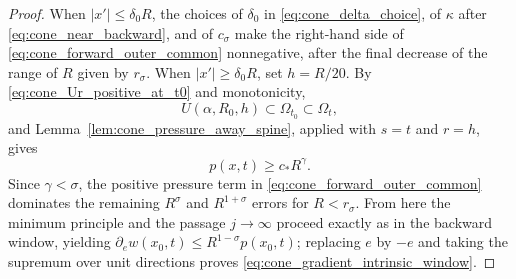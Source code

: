 \documentclass[11pt]{amsart}
\numberwithin{equation}{section}
\numberwithin{figure}{section}
\theoremstyle{plain}
\theoremstyle{definition}
\theoremstyle{remark}
\theoremstyle{plain}
\begin{document}
\begin{proof}
When \(|x'|\leq\delta_0R\), the choices of \(\delta_0\) in
\eqref{eq:cone_delta_choice}, of \(\kappa\) after
\eqref{eq:cone_near_backward}, and of \(c_\sigma\)  make the right-hand side of
\eqref{eq:cone_forward_outer_common} nonnegative, after the final decrease of the range of $R$ given by 
\(r_\sigma\). When \(|x'|\geq\delta_0R\), set \(h=R/20\). By
\eqref{eq:cone_Ur_positive_at_t0} and monotonicity,
\[
    U(\alpha,R_0,h)\subset\Omega_{t_0}\subset\Omega_t,
\]
and Lemma~\ref{lem:cone_pressure_away_spine}, applied with \(s=t\) and \(r=h\),
gives
\[
    p(x,t)\geq c_*R^\gamma.
\]
Since \(\gamma<\sigma\), the positive pressure term in
\eqref{eq:cone_forward_outer_common} dominates the remaining \(R^\sigma\) and
\(R^{1+\sigma}\) errors for \(R<r_\sigma\). From here the minimum
principle and the passage \(j\to\infty\) proceed exactly as in the backward
window, yielding \(\partial_e w(x_0,t)\leq R^{1-\sigma}p(x_0,t)\); replacing \(e\)
by \(-e\) and taking the supremum over unit directions proves
\eqref{eq:cone_gradient_intrinsic_window}.
\end{proof}
\end{document}
